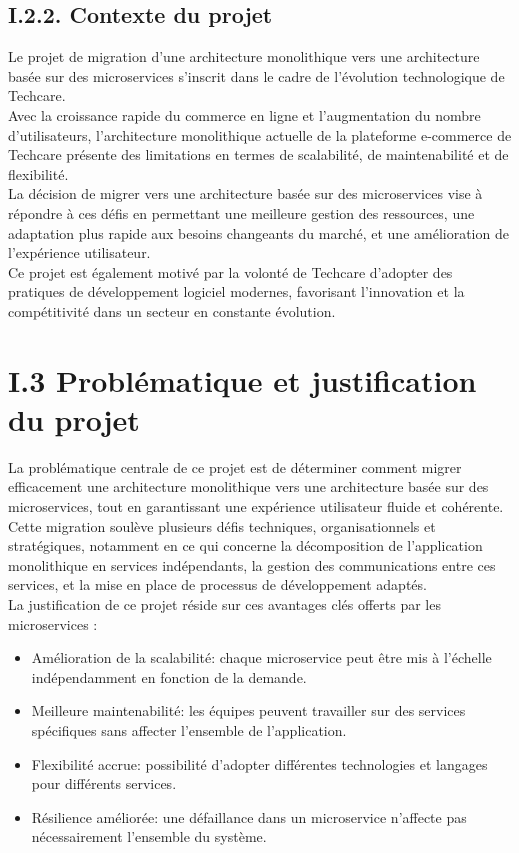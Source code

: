 \subsection{I.2.2. Contexte du projet}
Le projet de migration d'une architecture monolithique vers une architecture basée sur des microservices s'inscrit dans le cadre de l'évolution technologique de Techcare.\\
Avec la croissance rapide du commerce en ligne et l'augmentation du nombre d'utilisateurs, 
l'architecture monolithique actuelle de la plateforme e-commerce de Techcare présente des limitations en termes de scalabilité, de maintenabilité et de flexibilité.\\
La décision de migrer vers une architecture basée sur des microservices vise à répondre à ces défis en permettant une meilleure gestion des ressources, une adaptation plus rapide aux besoins changeants du marché, et une amélioration de l'expérience utilisateur.\\
Ce projet est également motivé par la volonté de Techcare d'adopter des pratiques de développement logiciel modernes, favorisant l'innovation et la compétitivité dans un secteur en constante évolution.

\section{I.3 Problématique et justification du projet}
La problématique centrale de ce projet est de déterminer comment migrer efficacement une architecture monolithique vers une architecture basée sur des microservices, tout en garantissant une expérience utilisateur fluide et cohérente.
Cette migration soulève plusieurs défis techniques, organisationnels et stratégiques, notamment en ce qui concerne la décomposition de l'application monolithique en services indépendants, la gestion des communications entre ces services, 
et la mise en place de processus de développement adaptés.\\
La justification de ce projet réside sur ces avantages clés offerts par les microservices :
\begin{itemize}
    \item Amélioration de la scalabilité: chaque microservice peut être mis à l'échelle indépendamment en fonction de la demande.
    \item Meilleure maintenabilité: les équipes peuvent travailler sur des services spécifiques sans affecter l'ensemble de l'application.
    \item Flexibilité accrue: possibilité d'adopter différentes technologies et langages pour différents services.
    \item Résilience améliorée: une défaillance dans un microservice n'affecte pas nécessairement l'ensemble du système.
\end{itemize}

